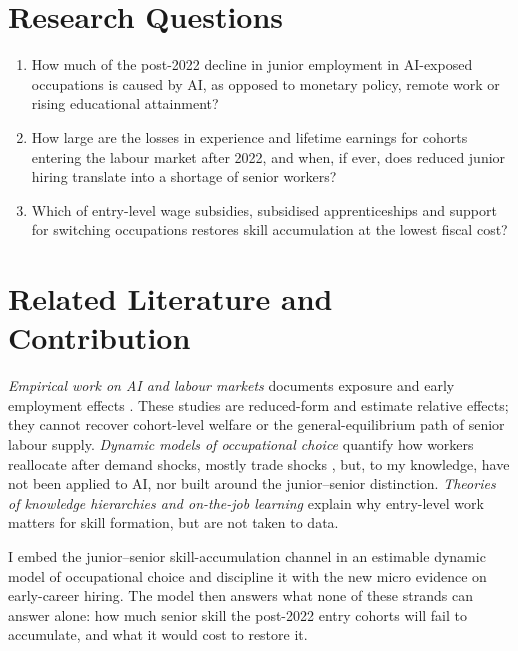 \documentclass[11pt,a4paper]{article}
\begin{document}
\section{Research Questions}

\begin{enumerate}[label=\textbf{Q\arabic*.}]
  \item How much of the post-2022 decline in junior employment in AI-exposed occupations is caused by AI, as opposed to monetary policy, remote work or rising educational attainment?
  \item How large are the losses in experience and lifetime earnings for cohorts entering the labour market after 2022, and when, if ever, does reduced junior hiring translate into a shortage of senior workers?
  \item Which of entry-level wage subsidies, subsidised apprenticeships and support for switching occupations restores skill accumulation at the lowest fiscal cost?
\end{enumerate}

\section{Related Literature and Contribution}

\textit{Empirical work on AI and labour markets} documents exposure \citep{eloundou2024, gmyrek2023} and early employment effects \citep{brynjolfsson2026canaries, tucker2026, hosseini2026, humlum2026}. These studies are reduced-form and estimate relative effects; they cannot recover cohort-level welfare or the general-equilibrium path of senior labour supply. \textit{Dynamic models of occupational choice} quantify how workers reallocate after demand shocks, mostly trade shocks \citep{keane1997, artuc2010, dixcarneiro2014, traiberman2019}, but, to my knowledge, have not been applied to AI, nor built around the junior--senior distinction. \textit{Theories of knowledge hierarchies and on-the-job learning} \citep{garicano2000, garicano2006, ide2026, friebel2026} explain why entry-level work matters for skill formation, but are not taken to data.

I embed the junior--senior skill-accumulation channel in an estimable dynamic model of occupational choice and discipline it with the new micro evidence on early-career hiring. The model then answers what none of these strands can answer alone: how much senior skill the post-2022 entry cohorts will fail to accumulate, and what it would cost to restore it.
\end{document}
